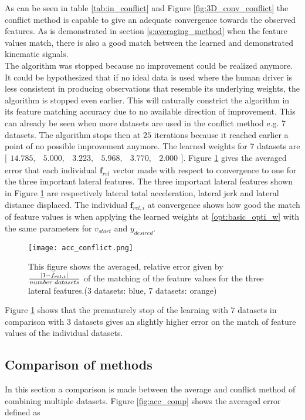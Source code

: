 As can be seen in table \ref{tab:in_conflict} and Figure \ref{fig:3D_conv_conflict} the conflict method is capable to give an adequate convergence towards the observed features. As is demonstrated in section \ref{s:averaging_method} when the feature values match, there is also a good match between the learned and demonstrated kinematic signals.\\
The algorithm was stopped because no improvement could be realized anymore. It could be hypothesized that if no ideal data is used where the human driver is less consistent in producing observations that resemble its underlying weights, the algorithm is stopped even earlier. This will naturally constrict the algorithm in its feature matching accuracy due to no available direction of improvement. This can already be seen when more datasets are used in the conflict method e.g. 7 datasets. The algorithm stops then at $25$ iterations because it reached earlier a point of no possible improvement anymore. The learned weights for 7 datasets are $\bigl[ \begin{smallmatrix} 14.785,&5.000,&3.223,&5.968,&3.770,&2.000\end{smallmatrix}\bigr]$. Figure \ref{fig:acc_conflict} gives the averaged error that each individual $\bm{f}_{rel}$ vector made with respect to convergence to one for the three important lateral features. The three important lateral features shown in Figure \ref{fig:acc_conflict} are respectively lateral total acceleration, lateral jerk and lateral distance displaced. The individual $\bm{f}_{rel,i}$ at convergence shows how good the match of feature values is when applying the learned weights at \ref{opt:basic_opti_w} with the same parameters for $v_{start}$ and $y_{desired}.$

\begin{figure}[h!]
	\centering
	\texttt{[image: acc\_conflict.png]}
	\caption{This figure shows the averaged, relative error given by $\frac{|1-f_{rel,i}|}{number\hspace{1mm}datasets}$ of the matching of the feature values for the three lateral features.(3 datasets: blue, 7 datasets: orange)}
	\label{fig:acc_conflict}
\end{figure}

Figure \ref{fig:acc_conflict} shows that the prematurely stop of the learning with 7 datasets in comparison with 3 datasets gives an slightly higher error on the match of feature values of the individual datasets.    
 
\subsection{Comparison of methods}
In this section a comparison is made between the average and conflict method of combining multiple datasets. Figure \ref{fig:acc_comp} shows the averaged error defined as 

